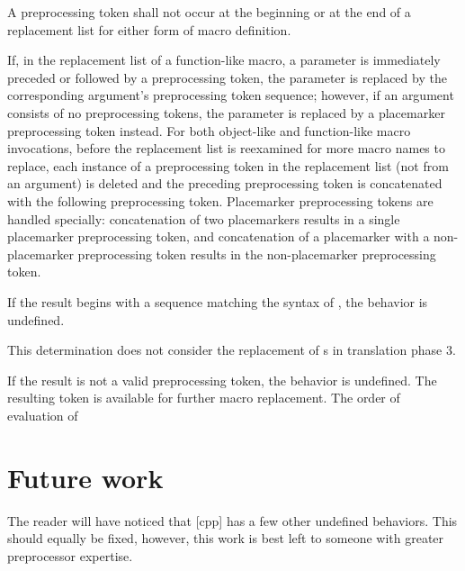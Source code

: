 \documentclass{wg21}
\begin{document}
\pnum
A
\tcode{\#\#}
preprocessing token shall not occur at the beginning or
at the end of a replacement list for either form
of macro definition.

\pnum
If, in the replacement list of a function-like macro, a parameter is
immediately preceded or followed by a
\tcode{\#\#}
preprocessing token, the parameter is replaced by the
corresponding argument's preprocessing token sequence; however, if an argument consists of no preprocessing tokens, the parameter is
replaced by a placemarker preprocessing token instead.
\pnum
For both object-like and function-like macro invocations, before the
replacement list is reexamined for more macro names to replace,
each instance of a
\tcode{\#\#}
preprocessing token in the replacement list
(not from an argument) is deleted and the
preceding preprocessing token is concatenated
with the following preprocessing token.
Placemarker preprocessing tokens are handled specially: concatenation
of two placemarkers results in a single placemarker preprocessing token, and
concatenation of a placemarker with a non-placemarker preprocessing token results
in the non-placemarker preprocessing token.
\begin{removedblock}
 If the result begins with a sequence matching the syntax of ,
the behavior is undefined.
\begin{note}
    This determination does not consider the replacement of
    s in translation phase 3.
\end{note}
\end{removedblock}
If the result is not a valid preprocessing token,
the behavior is undefined.
The resulting token is available for further macro replacement.
The order of evaluation of
\tcode{\#\#}

\section{Future work}

The reader will have noticed that [cpp] has a few other undefined behaviors.
This should equally be fixed, however, this work is best left to someone with greater preprocessor expertise.
\end{document}
